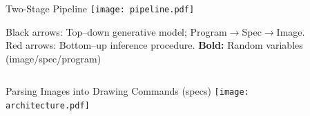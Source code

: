 \documentclass[final]{beamer}
\newlength{\sepwid}
\newlength{\onecolwid}
\newlength{\twocolwid}
\begin{document}
\begin{frame}[t]
\begin{columns}[t]
\begin{column}{\onecolwid}




\end{column} %

\begin{column}{\sepwid}\end{column} %

\begin{column}{\twocolwid} %

  \begin{block}{Two-Stage Pipeline}
\centering  \texttt{[image: pipeline.pdf]}
  
  Black arrows: Top--down generative model; Program$\to$Spec$\to$Image. {\color{red}Red} arrows: Bottom--up inference procedure. \textbf{Bold:} Random variables (image/spec/program)
\end{block}

\begin{columns}[t,totalwidth=\twocolwid] %

\begin{column}{\onecolwid}\vspace{-.6in} %

%

  
\begin{block}{Parsing Images into Drawing Commands (specs)}
\hspace{10cm}  \texttt{[image: architecture.pdf]}


\end{block}
\end{column}
\end{columns}
\end{column}
\end{columns}
\end{frame}
\end{document}

